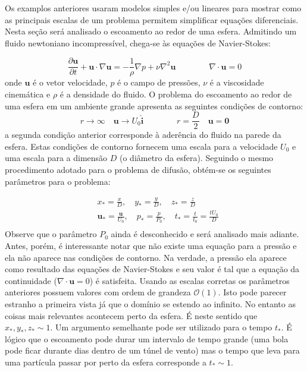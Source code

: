 \documentclass[article,12pt,oneside,a4paper,english,brazil,sumario=tradicional]{abntex2}
\newcommand{\p}[1]{\ensuremath{ \mathbf{#1}}}    %
\newcommand{\lra}{\ensuremath{\longrightarrow}}
\newcommand{\pd}{\ensuremath{\partial}}
\begin{document}
Os examplos anteriores usaram modelos simples e/ou lineares para mostrar como as principais escalas de um problema permitem simplificar equações diferenciais. Nesta seção será analisado o escoamento ao redor de uma esfera. Admitindo um fluido newtoniano incompressível, chega-se às equações de Navier-Stokes:

\begin{equation}
\frac{\pd\p{u}}{\pd t} + \p{u}\cdot\nabla\p{u} = -\frac{1}{\rho}\nabla p + \nu\nabla^2\p{u} \qquad\qquad \nabla\cdot\p{u} = 0
\label{eq:ns}
\end{equation}
onde $\p{u}$ é o vetor velocidade, $p$ é o campo de pressões, $\nu$ é a viscosidade cinemática e $\rho$ é a densidade do fluido. O problema do escoamento ao redor de uma esfera em um ambiente grande apresenta as seguintes condições de contorno:
\[
 r\lra\infty \quad \p{u}\lra U_0\p{\hat{i}} \qquad\qquad r=\frac{D}{2}\quad \p{u} = \p{0}
\]
a segunda condição anterior corresponde à aderência do fluido na parede da esfera. Estas condições de contorno fornecem uma escala para a velocidade $U_0$ e uma escala para a dimensão $D$ (o diâmetro da esfera). Seguindo o mesmo procedimento adotado para o problema de difusão, obtém-se os seguintes parâmetros para o problema:

\[
\begin{aligned}
&x_* = \frac{x}{D}, \quad y_* = \frac{y}{D}, \quad z_* = \frac{z}{D}\\
&\p{u}_* = \frac{\p{u}}{U_0}, \quad p_* = \frac{p}{P_0}, \quad t_* = \frac{t}{t_0} = \frac{tU_0}{D} \\
\end{aligned}
\]
Observe que o parâmetro $P_0$ ainda é desconhecido e será analisado mais adiante. Antes, porém, é interessante notar que não existe uma equação para a pressão e ela não aparece nas condições de contorno. Na verdade, a pressão ela aparece como resultado das equações de Navier-Stokes e seu valor é tal que a equação da continuidade ($\nabla\cdot\p{u}=0$) é satisfeita. Usando as escalas corretas os parâmetros anteriores possuem valores com ordem de grandeza $\mathcal{O}(1)$. Isto pode parecer estranho a primeira vista já que o domínio se estendo ao infinito. No entanto as coisas mais relevantes acontecem perto da esfera. É neste sentido que $x_*, y_*, z_* \sim 1$. Um argumento semelhante pode ser utilizado para o tempo $t_*$. É lógico que o escoamento pode durar um intervalo de tempo grande (uma bola pode ficar durante dias dentro de um túnel de vento) mas o tempo que leva para uma partícula passar por perto da esfera corresponde a  $t_*\sim 1$. 
\end{document}
